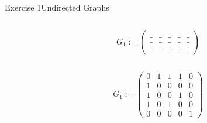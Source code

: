 \begin{frame}[allowframebreaks]{Exercise 1}{Undirected Graphs}
  \begin{solutionnoinc}
    \begin{columns}
      \begin{column}{0.5\textwidth}
      \end{column}
      \begin{column}{0.5\textwidth} 
        \centering
        $G_1 :=
        \begin{pmatrix}
        \_ & \_ & \_ & \_ & \_ \\
        \_ & \_ & \_ & \_ & \_ \\
        \_ & \_ & \_ & \_ & \_ \\
        \_ & \_ & \_ & \_ & \_ \\
        \_ & \_ & \_ & \_ & \_
        \end{pmatrix}$
      \end{column}
    \end{columns}
  \end{solutionnoinc}
  \begin{solutionnoinc}
    \begin{columns}
      \begin{column}{0.5\textwidth}
      \end{column}
      \begin{column}{0.5\textwidth} 
        \centering
        $G_1 :=
        \begin{pmatrix}
        0 & 1 & 1 & 1 & 0 \\
        1 & 0 & 0 & 0 & 0 \\
        1 & 0 & 0 & 1 & 0 \\
        1 & 0 & 1 & 0 & 0 \\
        0 & 0 & 0 & 0 & 1
        \end{pmatrix}$
      \end{column}
    \end{columns}
  \end{solutionnoinc}
  \begin{solutionnoinc}
    \begin{columns}
      \begin{column}{0.4\textwidth}
      \end{column}
\end{columns}
\end{solutionnoinc}
\end{frame}
